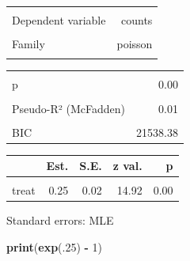 \documentclass[
]{article}
\newenvironment{Shaded}{\begin{snugshade}}{\end{snugshade}}
\newcommand{\DecValTok}[1]{\textcolor[rgb]{0.00,0.00,0.81}{#1}}
\newcommand{\FunctionTok}[1]{\textcolor[rgb]{0.13,0.29,0.53}{\textbf{#1}}}
\newcommand{\NormalTok}[1]{#1}
\newcommand{\SpecialCharTok}[1]{\textcolor[rgb]{0.81,0.36,0.00}{\textbf{#1}}}
\begin{document}
\begin{table}[!h]
\centering
\begin{tabular}{lr}
\toprule
\cellcolor{gray!10}{Observations} & \cellcolor{gray!10}{466}\\
Dependent variable & counts\\
\cellcolor{gray!10}{Type} & \cellcolor{gray!10}{Generalized linear model}\\
Family & poisson\\
\cellcolor{gray!10}{Link} & \cellcolor{gray!10}{log}\\
\bottomrule
\end{tabular}
\end{table} \begin{table}[!h]
\centering
\begin{tabular}{lr}
\toprule
\cellcolor{gray!10}{$\chi^2$(1)} & \cellcolor{gray!10}{223.34}\\
p & 0.00\\
\cellcolor{gray!10}{Pseudo-R² (Cragg-Uhler)} & \cellcolor{gray!10}{0.38}\\
Pseudo-R² (McFadden) & 0.01\\
\cellcolor{gray!10}{AIC} & \cellcolor{gray!10}{21530.09}\\
\addlinespace
BIC & 21538.38\\
\bottomrule
\end{tabular}
\end{table} \begin{table}[!h]
\centering
\begin{threeparttable}
\begin{tabular}{lrrrr}
\toprule
  & Est. & S.E. & z val. & p\\
\midrule
\cellcolor{gray!10}{(Intercept)} & \cellcolor{gray!10}{3.31} & \cellcolor{gray!10}{0.01} & \cellcolor{gray!10}{270.75} & \cellcolor{gray!10}{0.00}\\
treat & 0.25 & 0.02 & 14.92 & 0.00\\
\bottomrule
\end{tabular}
\begin{tablenotes}
\item Standard errors: MLE
\end{tablenotes}
\end{threeparttable}
\end{table}

\begin{Shaded}
\begin{Highlighting}[]
\FunctionTok{print}\NormalTok{(}\FunctionTok{exp}\NormalTok{(.}\DecValTok{25}\NormalTok{) }\SpecialCharTok{{-}} \DecValTok{1}\NormalTok{)}
\end{Highlighting}
\end{Shaded}
\end{document}
